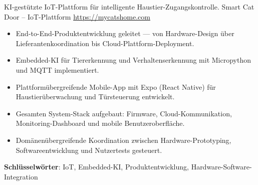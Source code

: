 \documentclass[a4paper, serif, 10pt]{moderncv}
\begin{document}
        {KI-gestützte IoT-Plattform für intelligente Haustier-Zugangskontrolle.}
        {Smart Cat Door – IoT-Plattform}
        {\url{https://mycatshome.com}}
        {}
        {\begin{itemize}
\item End-to-End-Produktentwicklung geleitet — von Hardware-Design über Lieferantenkoordination bis Cloud-Plattform-Deployment.
\item Embedded-KI für Tiererkennung und Verhaltenserkennung mit Micropython und MQTT implementiert.
\item Plattformübergreifende Mobile-App mit Expo (React Native) für Haustierüberwachung und Türsteuerung entwickelt.
\item Gesamten System-Stack aufgebaut: Firmware, Cloud-Kommunikation, Monitoring-Dashboard und mobile Benutzeroberfläche.
\item Domänenübergreifende Koordination zwischen Hardware-Prototyping, Softwareentwicklung und Nutzertests gesteuert.
\end{itemize}
\textbf{Schlüsselwörter}: IoT, Embedded-KI, Produktentwicklung, Hardware-Software-Integration}
\end{document}
